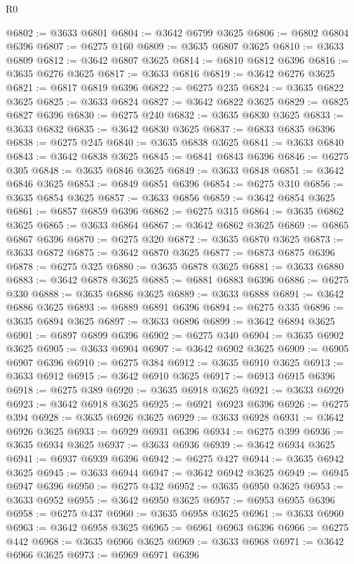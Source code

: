 \begin{lexlean}{R0}
\begin{coremodule}
@6802 := @3633 @6801
@6804 := @3642 @6799 @3625
@6806 := @6802 @6804 @6396
@6807 := @6275 @160
@6809 := @3635 @6807 @3625
@6810 := @3633 @6809
@6812 := @3642 @6807 @3625
@6814 := @6810 @6812 @6396
@6816 := @3635 @6276 @3625
@6817 := @3633 @6816
@6819 := @3642 @6276 @3625
@6821 := @6817 @6819 @6396
@6822 := @6275 @235
@6824 := @3635 @6822 @3625
@6825 := @3633 @6824
@6827 := @3642 @6822 @3625
@6829 := @6825 @6827 @6396
@6830 := @6275 @240
@6832 := @3635 @6830 @3625
@6833 := @3633 @6832
@6835 := @3642 @6830 @3625
@6837 := @6833 @6835 @6396
@6838 := @6275 @245
@6840 := @3635 @6838 @3625
@6841 := @3633 @6840
@6843 := @3642 @6838 @3625
@6845 := @6841 @6843 @6396
@6846 := @6275 @305
@6848 := @3635 @6846 @3625
@6849 := @3633 @6848
@6851 := @3642 @6846 @3625
@6853 := @6849 @6851 @6396
@6854 := @6275 @310
@6856 := @3635 @6854 @3625
@6857 := @3633 @6856
@6859 := @3642 @6854 @3625
@6861 := @6857 @6859 @6396
@6862 := @6275 @315
@6864 := @3635 @6862 @3625
@6865 := @3633 @6864
@6867 := @3642 @6862 @3625
@6869 := @6865 @6867 @6396
@6870 := @6275 @320
@6872 := @3635 @6870 @3625
@6873 := @3633 @6872
@6875 := @3642 @6870 @3625
@6877 := @6873 @6875 @6396
@6878 := @6275 @325
@6880 := @3635 @6878 @3625
@6881 := @3633 @6880
@6883 := @3642 @6878 @3625
@6885 := @6881 @6883 @6396
@6886 := @6275 @330
@6888 := @3635 @6886 @3625
@6889 := @3633 @6888
@6891 := @3642 @6886 @3625
@6893 := @6889 @6891 @6396
@6894 := @6275 @335
@6896 := @3635 @6894 @3625
@6897 := @3633 @6896
@6899 := @3642 @6894 @3625
@6901 := @6897 @6899 @6396
@6902 := @6275 @340
@6904 := @3635 @6902 @3625
@6905 := @3633 @6904
@6907 := @3642 @6902 @3625
@6909 := @6905 @6907 @6396
@6910 := @6275 @384
@6912 := @3635 @6910 @3625
@6913 := @3633 @6912
@6915 := @3642 @6910 @3625
@6917 := @6913 @6915 @6396
@6918 := @6275 @389
@6920 := @3635 @6918 @3625
@6921 := @3633 @6920
@6923 := @3642 @6918 @3625
@6925 := @6921 @6923 @6396
@6926 := @6275 @394
@6928 := @3635 @6926 @3625
@6929 := @3633 @6928
@6931 := @3642 @6926 @3625
@6933 := @6929 @6931 @6396
@6934 := @6275 @399
@6936 := @3635 @6934 @3625
@6937 := @3633 @6936
@6939 := @3642 @6934 @3625
@6941 := @6937 @6939 @6396
@6942 := @6275 @427
@6944 := @3635 @6942 @3625
@6945 := @3633 @6944
@6947 := @3642 @6942 @3625
@6949 := @6945 @6947 @6396
@6950 := @6275 @432
@6952 := @3635 @6950 @3625
@6953 := @3633 @6952
@6955 := @3642 @6950 @3625
@6957 := @6953 @6955 @6396
@6958 := @6275 @437
@6960 := @3635 @6958 @3625
@6961 := @3633 @6960
@6963 := @3642 @6958 @3625
@6965 := @6961 @6963 @6396
@6966 := @6275 @442
@6968 := @3635 @6966 @3625
@6969 := @3633 @6968
@6971 := @3642 @6966 @3625
@6973 := @6969 @6971 @6396

\end{coremodule}
\end{lexlean}

